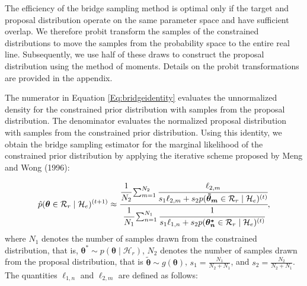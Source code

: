 \documentclass[
  english,
  man,floatsintext]{apa6}
\begin{document}
The efficiency of the bridge sampling method is optimal only if the target and proposal distribution operate on the same parameter space and have sufficient overlap. We therefore probit transform the samples of the constrained distributions to move the samples from the probability space to the entire real line. Subsequently, we use half of these draws to construct the proposal distribution using the method of moments. Details on the probit transformations are provided in the appendix.

The numerator in Equation \ref{Eq:bridgeidentity} evaluates the unnormalized density for the constrained prior distribution with samples from the proposal distribution. The denominator evaluates the normalized proposal distribution with samples from the constrained prior distribution. Using this identity, we obtain the bridge sampling estimator for the marginal likelihood of the constrained prior distribution by applying the iterative scheme proposed by Meng and Wong (1996):

\begin{align*}
    \hat p(\boldsymbol{\theta} \in \mathcal{R}_r \mid \mathcal{H}_e)^{(t+1)} \approx \cfrac{\cfrac{1}{N_2} \sum_{m = 1}^{N_2} \cfrac{\ell_{2,m}}{s_1 \ell_{2,m} + s_2 p(\boldsymbol{\tilde \theta_m} \in \mathcal{R}_r \mid \mathcal{H}_e)^{(t)}}}
    {\cfrac{1}{N_1} \sum_{n = 1}^{N_1} \cfrac{1}{s_1 \ell_{1,n} + s_2 p(\boldsymbol{\theta^*_n} \in \mathcal{R}_r \mid \mathcal{H}_e)^{(t)}}},
\end{align*}
where \(N_1\) denotes the number of samples drawn from the constrained distribution, that is, \(\boldsymbol{\theta}^* \sim p(\boldsymbol{\theta} \mid \mathcal{H}_r)\), \(N_2\) denotes the number of samples drawn from the proposal distribution, that is \(\boldsymbol{\tilde \theta} \sim g(\boldsymbol{\theta})\),
\(s_1 = \frac{N_1}{N_2 + N_1}\), and \(s_2 = \frac{N_2}{N_2 + N_1}\). The quantities \(\ell_{1,n}\) and \(\ell_{2,m}\) are defined as follows:
\end{document}
